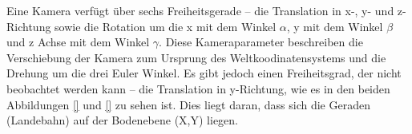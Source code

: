 \documentclass{ezb}
\begin{document}
Eine Kamera verfügt über sechs Freiheitsgerade – die Translation in x-, y- und z-Richtung sowie die Rotation um die x mit dem Winkel $\alpha$, y mit dem Winkel $\beta$ und z Achse mit dem Winkel $\gamma$. Diese Kameraparameter beschreiben die Verschiebung  der Kamera zum Ursprung des Weltkoodinatensystems und die Drehung um die drei Euler Winkel. Es gibt jedoch einen Freiheitsgrad, der nicht beobachtet werden kann – die Translation in y-Richtung, wie es in den beiden Abbildungen \ref{} und \ref{} zu sehen ist. Dies liegt daran, dass sich die Geraden (Landebahn) auf der Bodenebene (X,Y) liegen.


\end{document}
